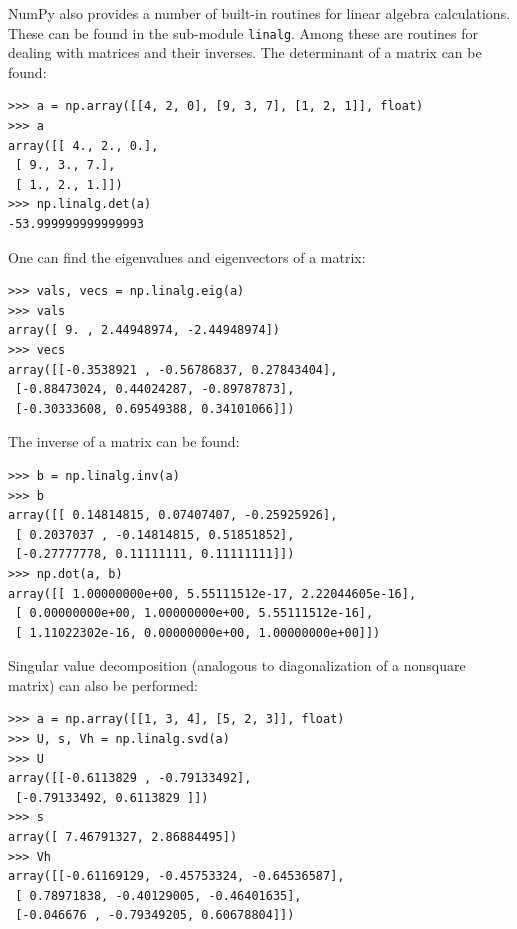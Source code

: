 \documentclass[12pt]{article}
\begin{document}
\normalsize

NumPy also provides a number of built-in routines for linear algebra calculations. These can 
be found in the sub-module \texttt{linalg}. Among these are routines for dealing with matrices and 
their inverses. The determinant of a matrix can be found: 
\footnotesize
\begin{Verbatim}[frame=single]
>>> a = np.array([[4, 2, 0], [9, 3, 7], [1, 2, 1]], float) 
>>> a 
array([[ 4., 2., 0.], 
 [ 9., 3., 7.], 
 [ 1., 2., 1.]]) 
>>> np.linalg.det(a) 
-53.999999999999993 
\end{Verbatim}
\normalsize
One can find the eigenvalues and eigenvectors of a matrix: 
\footnotesize
\begin{Verbatim}[frame=single]
>>> vals, vecs = np.linalg.eig(a) 
>>> vals 
array([ 9. , 2.44948974, -2.44948974]) 
>>> vecs 
array([[-0.3538921 , -0.56786837, 0.27843404], 
 [-0.88473024, 0.44024287, -0.89787873], 
 [-0.30333608, 0.69549388, 0.34101066]]) 
\end{Verbatim}
\normalsize
The inverse of a matrix can be found: 
\footnotesize
\begin{Verbatim}[frame=single]
>>> b = np.linalg.inv(a) 
>>> b 
array([[ 0.14814815, 0.07407407, -0.25925926], 
 [ 0.2037037 , -0.14814815, 0.51851852], 
 [-0.27777778, 0.11111111, 0.11111111]]) 
>>> np.dot(a, b) 
array([[ 1.00000000e+00, 5.55111512e-17, 2.22044605e-16], 
 [ 0.00000000e+00, 1.00000000e+00, 5.55111512e-16], 
 [ 1.11022302e-16, 0.00000000e+00, 1.00000000e+00]])
\end{Verbatim}
\normalsize
Singular value decomposition (analogous to diagonalization of a nonsquare matrix) can also be 
performed: 
\footnotesize
\begin{Verbatim}[frame=single]
>>> a = np.array([[1, 3, 4], [5, 2, 3]], float) 
>>> U, s, Vh = np.linalg.svd(a) 
>>> U 
array([[-0.6113829 , -0.79133492], 
 [-0.79133492, 0.6113829 ]]) 
>>> s 
array([ 7.46791327, 2.86884495]) 
>>> Vh 
array([[-0.61169129, -0.45753324, -0.64536587], 
 [ 0.78971838, -0.40129005, -0.46401635], 
 [-0.046676 , -0.79349205, 0.60678804]]) 
\end{Verbatim}
\normalsize
\end{document}
